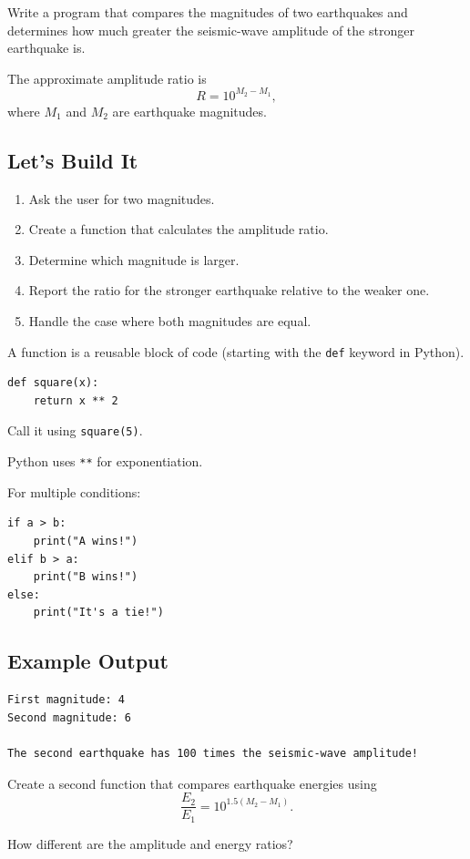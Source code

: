\documentclass[11pt,letterpaper]{article}
\newcommand{\steps}{\subsection*{Let's Build It}}
\newcommand{\exampleoutput}{\subsection*{Example Output}}
\begin{document}
\begin{missionbox}
Write a program that compares the magnitudes of two earthquakes and determines how much greater the seismic-wave amplitude of the stronger earthquake is.

The approximate amplitude ratio is
\[
R = 10^{M_2-M_1},
\]
where $M_1$ and $M_2$ are earthquake magnitudes.
\end{missionbox}

\steps

\begin{enumerate}
    \item Ask the user for two magnitudes.
    \item Create a function that calculates the amplitude ratio.
    \item Determine which magnitude is larger.
    \item Report the ratio for the stronger earthquake relative to the weaker one.
    \item Handle the case where both magnitudes are equal.
\end{enumerate}

\begin{hintbox}
A function is a reusable block of code (starting with the \texttt{def} keyword in Python).

\begin{lstlisting}
def square(x):
    return x ** 2
\end{lstlisting}

Call it using \texttt{square(5)}.

Python uses \texttt{**} for exponentiation.

For multiple conditions:

\begin{lstlisting}
if a > b:
    print("A wins!")
elif b > a:
    print("B wins!")
else:
    print("It's a tie!")
\end{lstlisting}
\end{hintbox}

\exampleoutput

\begin{lstlisting}[style=outputstyle]
First magnitude: 4
Second magnitude: 6

The second earthquake has 100 times the seismic-wave amplitude!
\end{lstlisting}

\begin{challengebox}
Create a second function that compares earthquake energies using
\[
\frac{E_2}{E_1}=10^{1.5(M_2-M_1)}.
\]

How different are the amplitude and energy ratios?
\end{challengebox}
\end{document}

